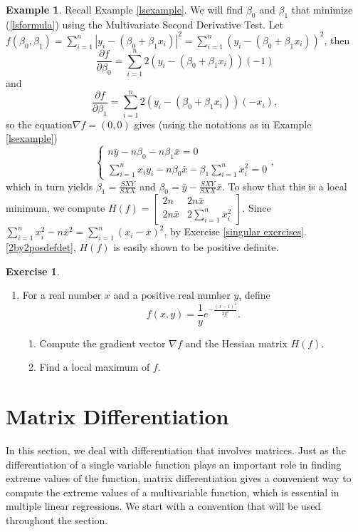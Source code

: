 \documentclass[12pt,letterpaper]{book}
\numberwithin{equation}{section}
\theoremstyle{definition}
\newtheorem{example}[thm]{\textbf{Example}}
\newtheorem{exercise}{\textbf{Exercise}}[chapter]
\begin{document}
\begin{example}\label{same with sdt}
Recall Example \ref{lsexample}. We will find $\beta_0$ and $\beta_1$ that minimize (\ref{lsformula}) using the Multivariate Second Derivative Test. Let $f(\beta_0,\beta_1)=\sum_{i=1}^n |y_i-(\beta_0+\beta_1 x_i)|^2=\sum_{i=1}^n (y_i-(\beta_0+\beta_1 x_i))^2$, then
$$\frac{\partial f}{\partial \beta_0}=\sum_{i=1}^n 2(y_i-(\beta_0+\beta_1 x_i))(-1)$$
and
$$\frac{\partial f}{\partial \beta_1}=\sum_{i=1}^n 2(y_i-(\beta_0+\beta_1 x_i))(-x_i),$$
so the equation$\nabla f=(0,0)$ gives (using the notations as in Example \ref{lsexample})
$$\begin{cases}n\bar{y}-n\beta_0-n\beta_1\bar{x} =0  \\ \sum_{i=1}^n x_iy_i-n\beta_0\bar{x}-\beta_1\sum_{i=1}^n x_i^2=0\end{cases},$$
which in turn yields $\beta_1=\frac{SXY}{SXX}$ and $\beta_0=\bar{y}-\frac{SXY}{SXX}\bar{x}$. To show that this is a local minimum, we compute $H(f)=\left[\begin{array}{cc} 2n & 2n\bar{x} \\ 2n\bar{x} & 2\sum_{i=1}^n x_i^2 \end{array}\right]$. Since $\sum_{i=1}^n x_i^2-n\bar{x}^2=\sum_{i=1}^n (x_i-\bar{x})^2$, by Exercise \ref{singular exercises}.\ref{2by2posdefdet}, $H(f)$ is easily shown to be positive definite.
\end{example}

\begin{exercise}\quad
\begin{enumerate}[\bfseries 1.]
\item For a real number $x$ and a positive real number $y$, define
$$f(x,y)=\frac{1}{y}e^{-\frac{(x-1)^2}{2y^2}}.$$
\begin{enumerate}
\item Compute the gradient vector $\nabla f$ and the Hessian matrix $H(f)$.
\item Find a local maximum of $f$.
\end{enumerate}

\end{enumerate}
\end{exercise}

\section{Matrix Differentiation}
In this section, we deal with differentiation that involves matrices. Just as the differentiation of a single variable function plays an important role in finding extreme values of the function, matrix differentiation gives a convenient way to compute the extreme values of a multivariable function, which is essential in multiple linear regressions. We start with a convention that will be used throughout the section.
\end{document}
